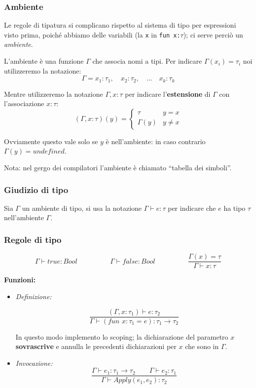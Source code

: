 \documentclass[a4paper,10pt]{article}
\begin{document}
     \subsubsection{Ambiente}
     Le regole di tipatura si complicano rispetto al sistema di tipo per espressioni visto prima, poiché abbiamo delle variabili (la \texttt{x} in \texttt{fun x:$\tau$}); ci serve perciò un \emph{ambiente}.\smallskip
     
     L'ambiente è una funzione $\Gamma$ che associa nomi a tipi. Per indicare $\Gamma(x_i) = \tau_i$ noi utilizzeremo la notazione:
     \[ \Gamma = x_1 : \tau_1,\quad x_2 : \tau_2, \quad\hdots \quad x_k:\tau_k \]
     
     Mentre utilizzeremo la notazione $\Gamma, x:\tau$ per indicare l'\textbf{estensione} di $\Gamma$ con l'associazione $x:\tau$:
     \[(\Gamma, x:\tau)(y) = \begin{cases}
                              \tau &y = x\\
                              \Gamma(y) & y \neq x
                             \end{cases}
     \]
     
     Ovviamente questo vale solo se $y$ è nell'ambiente: in caso contrario $\Gamma(y) = undefined$.\bigskip
     
     Nota: nel gergo dei compilatori l'ambiente è chiamato ``tabella dei simboli''.
     
     \subsubsection{Giudizio di tipo}
     Sia $\Gamma$ un ambiente di tipo, si usa la notazione $\Gamma \vdash e:\tau$ per indicare che $e$ ha tipo $\tau$ nell'ambiente $\Gamma$.
     
     \subsubsection{Regole di tipo}
     
     \[ \Gamma \vdash true : Bool \hspace{2cm}  \Gamma \vdash false : Bool \hspace{2cm} \dfrac{\Gamma(x) = \tau}{\Gamma \vdash x: \tau} \]
     
     \textbf{Funzioni:}\smallskip
     \begin{itemize}
      \item \emph{Definizione:}
     
     \[ \dfrac{(\Gamma, x : \tau_1) \vdash e:\tau _2}{\Gamma \vdash (fun\,\, x:\tau_1 = e): \tau_1 \to \tau_2} \]
     
     In questo modo implemento lo scoping; la dichiarazione del parametro $x$ \textbf{sovrascrive} e annulla le precedenti dichiarazioni per $x$ che sono in $\Gamma$.
     
     \item \emph{Invocazione:}
     \[ \dfrac{\Gamma \vdash e_1 : \tau_1 \to \tau_2 \quad\quad \Gamma \vdash e_2 : \tau_1}{\Gamma \vdash Apply(e_1, e_2) : \tau_2} \]
     \end{itemize}
\newpage
\end{document}
